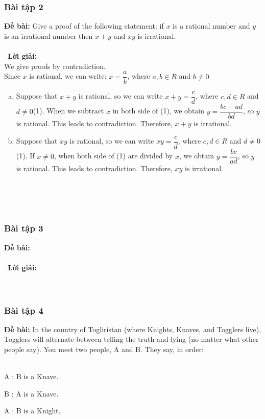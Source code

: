 \documentclass[a4paper]{article}
\begin{document}
\subsubsection{Bài tập 2} 
\textbf{Đề bài:} Give a proof of the following statement: if $x$ is a rational number and $y$ is an irrational number then $x+y$ and $xy$ is irrational.
\\\ \\\
\textbf{Lời giải:} \\We give proofs by contradiction.
\\Since $x$ is rational, we can write: $x=\dfrac{a}{b}$, where $a,b \in R$ and $b \neq 0$
\begin{enumerate}[a)]
\item Suppose that $x+y$ is rational, so we can write $x+y=\dfrac{c}{d}$, where $c,d \in R$ and $d \neq 0$(1). When we subtract $x$ in both side of (1), we obtain $y=\dfrac{bc-ad}{bd}$, so $y$ is rational. This leads to contradiction. Therefore, $x+y$ is irrational.
\item Suppose that $xy$ is rational, so we can write $xy=\dfrac{c}{d}$, where $c,d \in R$ and $d \neq 0$(1). If $x \neq 0$, when both side of (1) are divided by $x$, we obtain $y=\dfrac{bc}{ad}$, so $y$ is rational. This leads to contradiction. Therefore, $xy$ is irrational.
\end{enumerate} \\\ \\\
\clearpage
\subsubsection{Bài tập 3}
\textbf{Đề bài:} 
\\\ \\\
\textbf{Lời giải:} \\\ \\\
\clearpage
\subsubsection{Bài tập 4}
\textbf{Đề bài:} In the country of Togliristan (where Knights, Knaves, and Togglers live), Togglers will alternate between telling the truth and lying (no matter what other people say). You meet two people, A and B. They say, in order: \\\

A : B is a Knave. 

B : A is a Knave.

A : B is a Knight.
\end{document}
